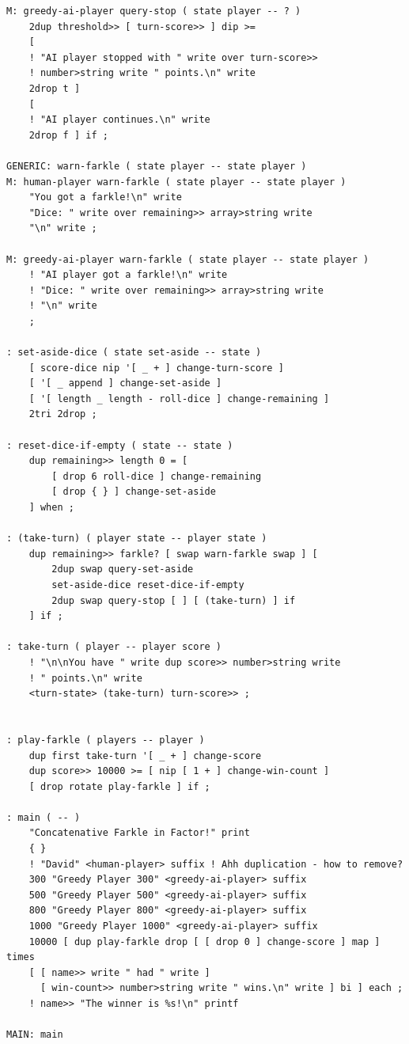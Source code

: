 \documentclass{article}
\begin{document}
\begin{verbatim}
M: greedy-ai-player query-stop ( state player -- ? )
    2dup threshold>> [ turn-score>> ] dip >=
    [ 
    ! "AI player stopped with " write over turn-score>>
    ! number>string write " points.\n" write 
    2drop t ]
    [
    ! "AI player continues.\n" write
    2drop f ] if ;

GENERIC: warn-farkle ( state player -- state player )
M: human-player warn-farkle ( state player -- state player )
    "You got a farkle!\n" write
    "Dice: " write over remaining>> array>string write
    "\n" write ;

M: greedy-ai-player warn-farkle ( state player -- state player )
    ! "AI player got a farkle!\n" write
    ! "Dice: " write over remaining>> array>string write
    ! "\n" write
    ;

: set-aside-dice ( state set-aside -- state )
    [ score-dice nip '[ _ + ] change-turn-score ]
    [ '[ _ append ] change-set-aside ]
    [ '[ length _ length - roll-dice ] change-remaining ]
    2tri 2drop ;

: reset-dice-if-empty ( state -- state )
    dup remaining>> length 0 = [
        [ drop 6 roll-dice ] change-remaining
        [ drop { } ] change-set-aside
    ] when ;

: (take-turn) ( player state -- player state )
    dup remaining>> farkle? [ swap warn-farkle swap ] [
        2dup swap query-set-aside
        set-aside-dice reset-dice-if-empty
        2dup swap query-stop [ ] [ (take-turn) ] if
    ] if ;

: take-turn ( player -- player score ) 
    ! "\n\nYou have " write dup score>> number>string write
    ! " points.\n" write
    <turn-state> (take-turn) turn-score>> ;


: play-farkle ( players -- player ) 
    dup first take-turn '[ _ + ] change-score
    dup score>> 10000 >= [ nip [ 1 + ] change-win-count ]
    [ drop rotate play-farkle ] if ;

: main ( -- )
    "Concatenative Farkle in Factor!" print
    { }
    ! "David" <human-player> suffix ! Ahh duplication - how to remove?
    300 "Greedy Player 300" <greedy-ai-player> suffix
    500 "Greedy Player 500" <greedy-ai-player> suffix
    800 "Greedy Player 800" <greedy-ai-player> suffix
    1000 "Greedy Player 1000" <greedy-ai-player> suffix
    10000 [ dup play-farkle drop [ [ drop 0 ] change-score ] map ] times
    [ [ name>> write " had " write ]
      [ win-count>> number>string write " wins.\n" write ] bi ] each ;
    ! name>> "The winner is %s!\n" printf

MAIN: main
\end{verbatim}
\end{document}
